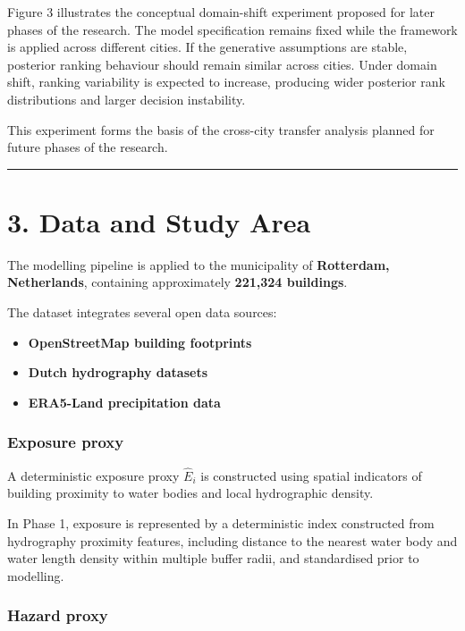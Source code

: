 \documentclass[
]{article}
\providecommand{\tightlist}{%
  \setlength{\itemsep}{0pt}\setlength{\parskip}{0pt}}
\begin{document}
Figure 3 illustrates the conceptual domain-shift experiment proposed for
later phases of the research. The model specification remains fixed
while the framework is applied across different cities. If the
generative assumptions are stable, posterior ranking behaviour should
remain similar across cities. Under domain shift, ranking variability is
expected to increase, producing wider posterior rank distributions and
larger decision instability.

This experiment forms the basis of the cross-city transfer analysis
planned for future phases of the research.

\begin{center}\rule{0.5\linewidth}{0.5pt}\end{center}

\section{3. Data and Study Area}\label{data-and-study-area}

The modelling pipeline is applied to the municipality of
\textbf{Rotterdam, Netherlands}, containing approximately
\textbf{221,324 buildings}.

The dataset integrates several open data sources:

\begin{itemize}
\tightlist
\item
  \textbf{OpenStreetMap building footprints}
\item
  \textbf{Dutch hydrography datasets}
\item
  \textbf{ERA5-Land precipitation data}
\end{itemize}

\subsubsection{Exposure proxy}\label{exposure-proxy}

A deterministic exposure proxy \(\hat{E}_i\) is constructed using
spatial indicators of building proximity to water bodies and local
hydrographic density.

In Phase 1, exposure is represented by a deterministic index constructed
from hydrography proximity features, including distance to the nearest
water body and water length density within multiple buffer radii, and
standardised prior to modelling.

\subsubsection{Hazard proxy}\label{hazard-proxy}
\end{document}
